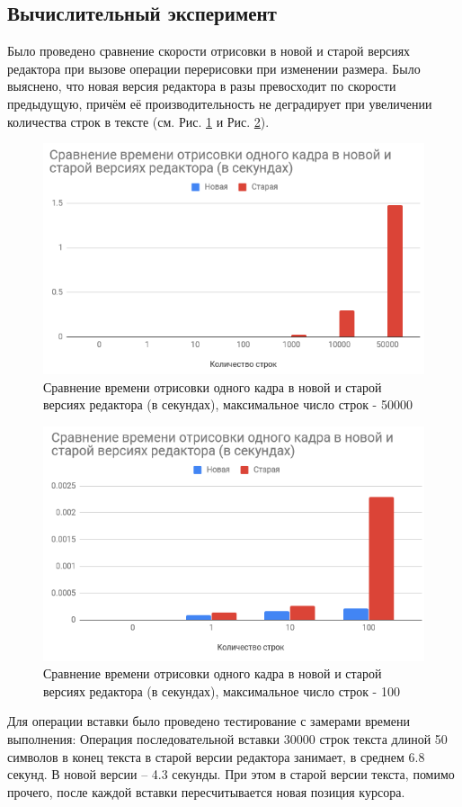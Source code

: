 \documentclass{fefu}
\begin{document}
		\subsection{Вычислительный эксперимент}
			\par Было проведено сравнение скорости отрисовки в новой и старой версиях 
			редактора при вызове операции перерисовки при изменении размера. Было выяснено, что 
			новая версия редактора в разы превосходит по скорости предыдущую, причём её 
			производительность не деградирует при увеличении количества строк в тексте (см. 
			Рис. \ref{img:RenderComparisonBig} и Рис. \ref{img:RenderComparisonSmall}).
			\begin{figure}[h]
				\centering
				\includegraphics[width=0.8\linewidth]{images/RenderComparisonBig.png}
				\caption{Сравнение времени отрисовки одного кадра в новой и старой версиях 
				редактора (в секундах), максимальное число строк - 50000}
				\label{img:RenderComparisonBig}
			\end{figure}
			\begin{figure}[H]
				\centering
				\includegraphics[width=0.8\linewidth]{images/RenderComparisonSmall.png}
				\caption{Сравнение времени отрисовки одного кадра в новой и старой версиях 
				редактора (в секундах), максимальное число строк - 100}
				\label{img:RenderComparisonSmall}
			\end{figure}
			\par Для операции вставки было проведено тестирование с замерами времени 
			выполнения:
			Операция последовательной вставки 30000 строк текста длиной 50 символов в конец
			текста в старой версии редактора занимает, в среднем 6.8 секунд. В новой 
			версии -- 4.3 секунды. При этом в старой версии текста, помимо прочего, после 
			каждой вставки пересчитывается новая позиция курсора.
\end{document}
